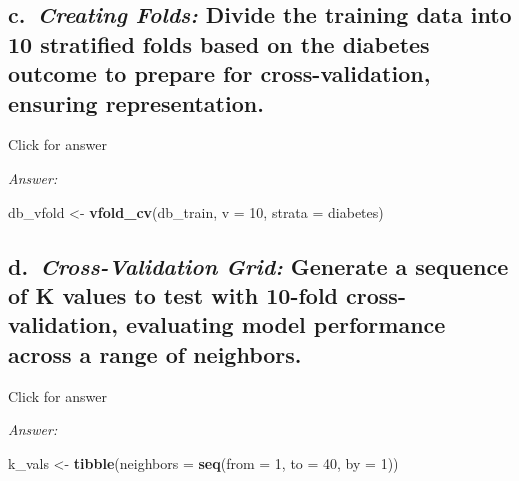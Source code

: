 \documentclass[
]{book}
\newenvironment{Shaded}{\begin{snugshade}}{\end{snugshade}}
\newcommand{\AttributeTok}[1]{\textcolor[rgb]{0.13,0.29,0.53}{#1}}
\newcommand{\DecValTok}[1]{\textcolor[rgb]{0.00,0.00,0.81}{#1}}
\newcommand{\FunctionTok}[1]{\textcolor[rgb]{0.13,0.29,0.53}{\textbf{#1}}}
\newcommand{\NormalTok}[1]{#1}
\newcommand{\OtherTok}[1]{\textcolor[rgb]{0.56,0.35,0.01}{#1}}
\begin{document}
\hypertarget{c.-creating-folds-divide-the-training-data-into-10-stratified-folds-based-on-the-diabetes-outcome-to-prepare-for-cross-validation-ensuring-representation.}{%
\subsection{\texorpdfstring{c.~\emph{Creating Folds:} Divide the training data into 10 stratified folds based on the diabetes outcome to prepare for cross-validation, ensuring representation.}{c.~Creating Folds: Divide the training data into 10 stratified folds based on the diabetes outcome to prepare for cross-validation, ensuring representation.}}\label{c.-creating-folds-divide-the-training-data-into-10-stratified-folds-based-on-the-diabetes-outcome-to-prepare-for-cross-validation-ensuring-representation.}}

Click for answer

\emph{Answer:}

\begin{Shaded}
\begin{Highlighting}[]
\NormalTok{db\_vfold }\OtherTok{\textless{}{-}} \FunctionTok{vfold\_cv}\NormalTok{(db\_train, }\AttributeTok{v =} \DecValTok{10}\NormalTok{, }\AttributeTok{strata =}\NormalTok{ diabetes)}
\end{Highlighting}
\end{Shaded}

\hypertarget{d.-cross-validation-grid-generate-a-sequence-of-k-values-to-test-with-10-fold-cross-validation-evaluating-model-performance-across-a-range-of-neighbors.}{%
\subsection{\texorpdfstring{d.~\emph{Cross-Validation Grid:} Generate a sequence of K values to test with 10-fold cross-validation, evaluating model performance across a range of neighbors.}{d.~Cross-Validation Grid: Generate a sequence of K values to test with 10-fold cross-validation, evaluating model performance across a range of neighbors.}}\label{d.-cross-validation-grid-generate-a-sequence-of-k-values-to-test-with-10-fold-cross-validation-evaluating-model-performance-across-a-range-of-neighbors.}}

Click for answer

\emph{Answer:}

\begin{Shaded}
\begin{Highlighting}[]
\NormalTok{k\_vals }\OtherTok{\textless{}{-}} \FunctionTok{tibble}\NormalTok{(}\AttributeTok{neighbors =} \FunctionTok{seq}\NormalTok{(}\AttributeTok{from =} \DecValTok{1}\NormalTok{, }\AttributeTok{to =} \DecValTok{40}\NormalTok{, }\AttributeTok{by =} \DecValTok{1}\NormalTok{))}
\end{Highlighting}
\end{Shaded}
\end{document}

